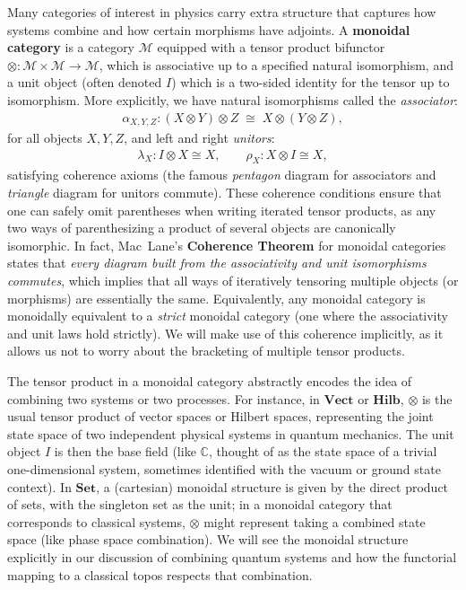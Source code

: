 Many categories of interest in physics carry extra structure that captures how systems combine and how certain morphisms have adjoints. A \textbf{monoidal category} is a category $\mathcal{M}$ equipped with a tensor product bifunctor $\otimes: \mathcal{M} \times \mathcal{M} \to \mathcal{M}$, which is associative up to a specified natural isomorphism, and a unit object (often denoted $I$) which is a two-sided identity for the tensor up to isomorphism. More explicitly, we have natural isomorphisms called the \emph{associator}:
\begin{align*}
\alpha_{X,Y,Z}: (X\otimes Y)\otimes Z \;\cong\; X \otimes (Y \otimes Z),
\end{align*}
for all objects $X,Y,Z$, and left and right \emph{unitors}:
\begin{align*}
\lambda_X: I\otimes X \cong X, \qquad \rho_X: X\otimes I \cong X,
\end{align*}
satisfying coherence axioms (the famous \emph{pentagon} diagram for associators and \emph{triangle} diagram for unitors commute). These coherence conditions ensure that one can safely omit parentheses when writing iterated tensor products, as any two ways of parenthesizing a product of several objects are canonically isomorphic. In fact, Mac~Lane's \textbf{Coherence Theorem} for monoidal categories states that \textit{every diagram built from the associativity and unit isomorphisms commutes}, which implies that all ways of iteratively tensoring multiple objects (or morphisms) are essentially the same. Equivalently, any monoidal category is monoidally equivalent to a \emph{strict} monoidal category (one where the associativity and unit laws hold strictly). We will make use of this coherence implicitly, as it allows us not to worry about the bracketing of multiple tensor products.

\vspace{1em}
The tensor product in a monoidal category abstractly encodes the idea of combining two systems or two processes. For instance, in $\mathbf{Vect}$ or $\mathbf{Hilb}$, $\otimes$ is the usual tensor product of vector spaces or Hilbert spaces, representing the joint state space of two independent physical systems in quantum mechanics. The unit object $I$ is then the base field (like $\mathbb{C}$, thought of as the state space of a trivial one-dimensional system, sometimes identified with the vacuum or ground state context). In $\mathbf{Set}$, a (cartesian) monoidal structure is given by the direct product of sets, with the singleton set as the unit; in a monoidal category that corresponds to classical systems, $\otimes$ might represent taking a combined state space (like phase space combination). We will see the monoidal structure explicitly in our discussion of combining quantum systems and how the functorial mapping to a classical topos respects that combination.

